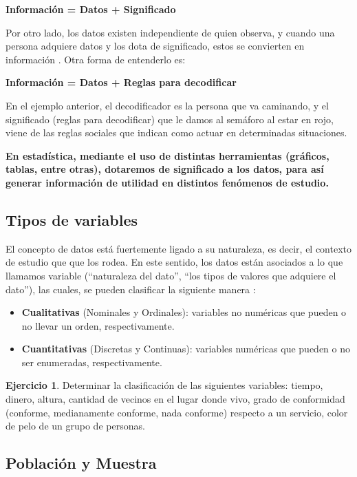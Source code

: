 \documentclass[
  11pt,
]{book}
\providecommand{\tightlist}{%
  \setlength{\itemsep}{0pt}\setlength{\parskip}{0pt}}
\theoremstyle{definition}
\theoremstyle{definition}
\theoremstyle{definition}
\newtheorem{exercise}{Ejercicio}[chapter]
\theoremstyle{definition}
\theoremstyle{remark}
\begin{document}
\textbf{Información = Datos + Significado}

Por otro lado, los datos existen independiente de quien observa, y cuando una persona adquiere datos y los dota de significado, estos se convierten en información \citep{brachman_knowledge_2004}. Otra forma de entenderlo es:

\textbf{Información = Datos + Reglas para decodificar}

En el ejemplo anterior, el decodificador es la persona que va caminando, y el significado (reglas para decodificar) que le damos al semáforo al estar en rojo, viene de las reglas sociales que indican como actuar en determinadas situaciones.

\textbf{En estadística, mediante el uso de distintas herramientas (gráficos, tablas, entre otras), dotaremos de significado a los datos, para así generar información de utilidad en distintos fenómenos de estudio.}

\subsection{Tipos de variables}\label{tipos-de-variables}

El concepto de datos está fuertemente ligado a su naturaleza, es decir, el contexto de estudio que que los rodea. En este sentido, los datos están asociados a lo que llamamos variable (``naturaleza del dato'', ``los tipos de valores que adquiere el dato''), las cuales, se pueden clasificar la siguiente manera \citep[página 7]{anderson}:

\begin{itemize}
\tightlist
\item
  \textbf{Cualitativas} (Nominales y Ordinales): variables no numéricas que pueden o no llevar un orden, respectivamente.
\item
  \textbf{Cuantitativas} (Discretas y Continuas): variables numéricas que pueden o no ser enumeradas, respectivamente.
\end{itemize}

\begin{exercise}
Determinar la clasificación de las siguientes variables: tiempo, dinero, altura, cantidad de vecinos en el lugar donde vivo, grado de conformidad (conforme, medianamente conforme, nada conforme) respecto a un servicio, color de pelo de un grupo de personas.
\end{exercise}

\subsection{Población y Muestra}\label{poblaciuxf3n-y-muestra}
\end{document}
